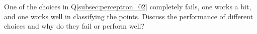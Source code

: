 \item {} 
One of the choices in Q\ref{subsec:perceptron_02} completely fails, one works a bit, and one works well in classifying the points.
Discuss the performance of different choices and why do they fail or perform well?

